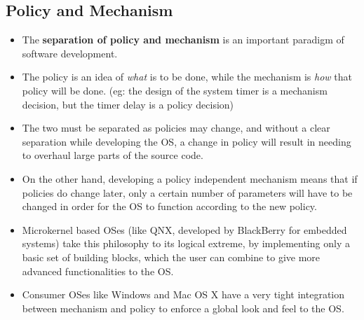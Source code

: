 \documentclass{article}
\theoremstyle{plain}
\theoremstyle{definition}
\begin{document}
\subsection{Policy and Mechanism}
\begin{itemize}
    \item The \textbf{separation of policy and mechanism} is an important paradigm of software development. 
    
    \item The policy is an idea of \textit{what} is to be done, while the mechanism is \textit{how} that policy will be done. (eg: the design of the system timer is a mechanism decision, but the timer delay is a policy decision)
    
    \item The two must be separated as policies may change, and without a clear separation while developing the OS, a change in policy will result in needing to overhaul large parts of the source code. 
    
    \item On the other hand, developing a policy independent mechanism means that if policies do change later, only a certain number of parameters will have to be changed in order for the OS to function according to the new policy. 
    
    \item Microkernel based OSes (like QNX, developed by BlackBerry for embedded systems) take this philosophy to its logical extreme, by implementing only a basic set of building blocks, which the user can combine to give more advanced functionalities to the OS.
    
    \item Consumer OSes like Windows and Mac OS X have a very tight integration between mechanism and policy to enforce a global look and feel to the OS. 
\end{itemize}
\end{document}

